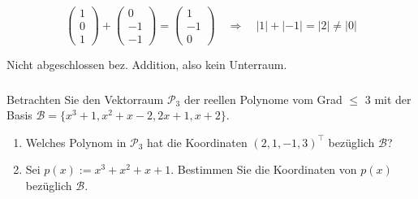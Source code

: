 \begin{solution}
    \begin{equation*}
        \begin{pmatrix}
            1 \\ 0 \\ 1
        \end{pmatrix} + \begin{pmatrix}
            0 \\ -1 \\ -1
        \end{pmatrix} = \begin{pmatrix}
            1 \\ -1 \\ 0
        \end{pmatrix} \quad \Rightarrow \quad |1| + |-1| = |2| \neq |0|
    \end{equation*}

    Nicht abgeschlossen bez. Addition, also kein Unterraum.

\end{solution}

\newpage

\subsubsection{} %

Betrachten Sie den Vektorraum \( \mathcal{P}_3 \) der reellen Polynome vom Grad \( \leq \) 3 mit der Basis \( \mathcal{B} = \{x^3+1,x^2+x-2,2x+1,x+2\} \).

\begin{enumerate}[label=\alph*)]
    \item Welches Polynom in \( \mathcal{P}_3 \) hat die Koordinaten \( (2,1,-1,3)^\top \) bezüglich \( \mathcal{B} \)?
    \item Sei \( p(x):=x^3+x^2+x+1 \). Bestimmen Sie die Koordinaten von \( p(x) \) bezüglich \( \mathcal{B} \).
\end{enumerate}

\vspace{1\baselineskip}

